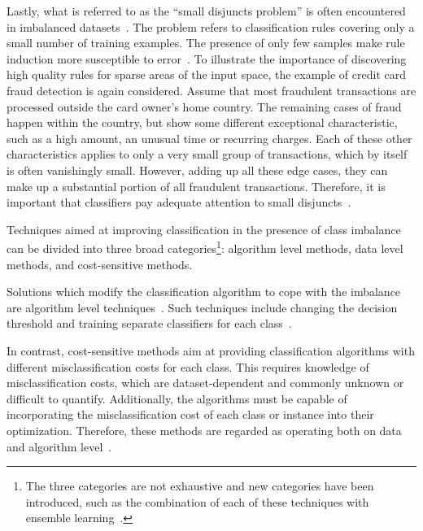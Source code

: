 \documentclass[sort&compress]{elsarticle}
\begin{document}
Lastly, what is referred to as the ``small disjuncts problem'' is often encountered in imbalanced datasets~\citep{Galar.2012}. The problem refers to classification rules covering only a small number of training examples. The presence of only few samples make rule induction more susceptible to error~\citep{Holte.1989}. To illustrate the importance of discovering high quality rules for sparse areas of the input space, the example of credit card fraud detection is again considered. Assume that most fraudulent transactions are processed outside the card owner's home country. The remaining cases of fraud happen within the country, but show some different exceptional characteristic, such as a high amount, an unusual time or recurring charges. Each of these other characteristics applies to only a very small group of transactions, which by itself is often vanishingly small. However, adding up all these edge cases, they can make up a substantial portion of all fraudulent transactions. Therefore, it is important that classifiers pay adequate attention to small disjuncts~\citep{Holte.1989}.

Techniques aimed at improving classification in the presence of class imbalance can be divided into three broad categories\footnote{The three categories are not exhaustive and new categories have been introduced, such as the combination of each of these techniques with ensemble learning~\citep{Galar.2012,Diez-pastor.2015,Galar.2016}.}: algorithm level methods, data level methods, and cost-sensitive methods.

Solutions which modify the classification algorithm to cope with the imbalance are algorithm level techniques~\citep{Kotsiantis.2006,Galar.2012}. Such techniques include changing the decision threshold and training separate classifiers for each class~\citep{Kotsiantis.2006,Chawla.2004}. 

In contrast, cost-sensitive methods aim at providing classification algorithms with different misclassification costs for each class. This requires knowledge of misclassification costs, which are dataset-dependent and commonly unknown or difficult to quantify. Additionally, the algorithms must be capable of incorporating the misclassification cost of each class or instance into their optimization. Therefore, these methods are regarded as operating both on data and algorithm level~\citep{Galar.2012}.
\end{document}
